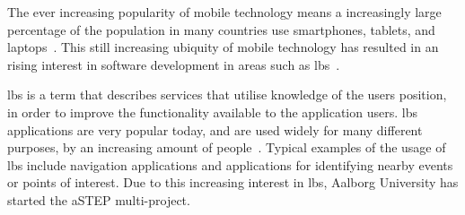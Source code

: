 The ever increasing popularity of mobile technology means a increasingly large percentage of the population in many countries use smartphones, tablets, and laptops~\cite{techcrunch_mobile_usage}. This still increasing ubiquity of mobile technology has resulted in an rising interest in software development in areas such as \gls{lbs}~\cite{dey2010location}. 

\gls{lbs} is a term that describes services that utilise knowledge of the users position, in order to improve the functionality available to the application users. \gls{lbs} applications are very popular today, and are used widely for many different purposes, by an increasing amount of people~\cite[1-2]{schiller2004location}. Typical examples of the usage of \gls{lbs} include navigation applications and applications for identifying nearby events or points of interest. Due to this increasing interest in \gls{lbs}, Aalborg University has started the aSTEP multi-project. 


